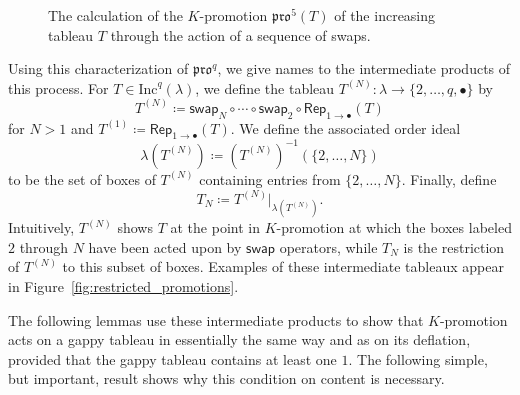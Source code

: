 \documentclass[12pt]{amsart}
\theoremstyle{definition}
\theoremstyle{remark}
\numberwithin{equation}{section}
\newcommand{\inc}{\ensuremath{\mathrm{Inc}}}
\newcommand{\pro}{\mathfrak{pro}}
\newcommand{\swap}{\ensuremath{\mathsf{swap}}}
\newcommand{\decr}{\ensuremath{\mathsf{Decr}}}
\newcommand{\rep}{\ensuremath{\mathsf{Rep}}}
\begin{document}
 \begin{figure}[h]
\caption{The calculation of the $K$-promotion $\pro^{5}(T)$ of the increasing tableau $T$ through the action of a sequence of swaps.}\label{fig:promotion_via_swaps}
 \end{figure}

Using this characterization of $\pro^q$, we give names to the intermediate products of this process.
For $T \in \inc^q(\lambda)$, we define the tableau $T^{(N)}: \lambda \rightarrow \lbrace 2, \dots, q, \bullet \rbrace$ by 
\[T^{(N)} \coloneqq \swap_N \circ \cdots \circ \swap_2 \circ \rep_{1 \rightarrow \bullet}(T)\] for $N > 1$ and $T^{(1)} \coloneqq \rep_{1 \rightarrow \bullet}(T)$. We define the associated order ideal 
\[
\lambda \left( T^{(N)} \right) \coloneqq \left( T^{(N)} \right)^{-1}(\{2,\dots,N\})
\]
 to be the set of boxes of $T^{(N)}$ containing entries from $\{2,\dots,N\}$. Finally, define 
 \[
 T_N \coloneqq T^{(N)} \vert_{\lambda \left( T^{(N)} \right) }.
 \]
  Intuitively, $T^{(N)}$ shows $T$ at the point in $K$-promotion at which the boxes labeled $2$ through $N$ have been acted upon by $\swap$ operators, while $T_N$ is the restriction of $T^{(N)}$ to this subset of boxes. Examples of these intermediate tableaux appear in Figure~\ref{fig:restricted_promotions}. 
  
  The following lemmas use these intermediate products to show that $K$-promotion acts on a gappy tableau in essentially the same way and as on its deflation, provided that the gappy tableau contains at least one $1$. The following simple, but important, result shows why this condition on content is necessary.
\end{document}
